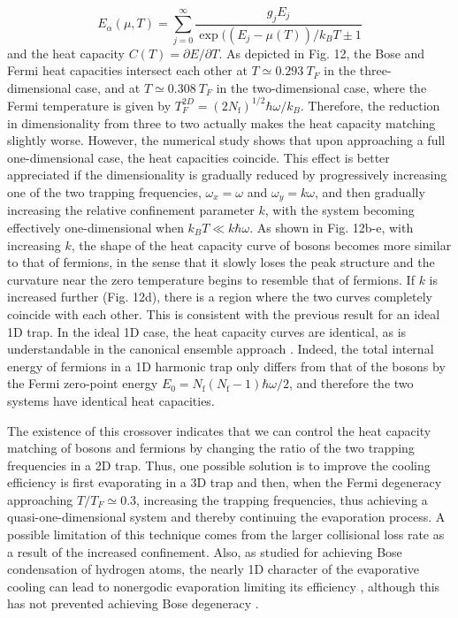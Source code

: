 \documentclass[pra,letterpaper,twocolumn,showpacs,superscriptaddress]{revtex4}
\begin{document}
\begin{equation}
E_\alpha(\mu, T) = \sum_{j=0}^{\infty} \frac{g_j E_j}{\exp((E_j - \mu(T))/k_B T\pm 1}
\end{equation}
and the heat capacity $C (T) = \partial E/\partial T$.  As depicted in Fig. 12, the Bose and Fermi heat capacities intersect each other at 
$T \simeq 0.293~T_F$ in the three-dimensional case, and at $T \simeq 0.308~T_F$ in the two-dimensional case, where the Fermi temperature is 
given by $T_F^{2D} = (2N_\mathrm{f})^{1/2} \hbar \omega/k_B$. Therefore, the reduction in dimensionality from three to two actually makes the heat capacity 
matching slightly worse. However, the numerical study shows that upon approaching a full one-dimensional case, the heat capacities coincide. 
This effect is better appreciated if the dimensionality is gradually reduced by progressively increasing one of the two trapping frequencies, 
$\omega_x=\omega$ and $\omega_y=k \omega$, and then gradually increasing the relative confinement parameter $k$, with the  
system becoming effectively one-dimensional when $k_B T \ll k \hbar \omega$.  As shown in Fig. 12b-e, with increasing $k$, the
shape of the heat capacity curve of bosons becomes more similar to that of fermions, in the sense that it slowly loses the peak structure  
and the curvature near the zero temperature begins to resemble that of fermions. If $k$ is increased further (Fig. 12d), there is
 a region where the two curves completely coincide with each other. This is consistent with the previous result for an ideal 1D
trap.  In the ideal 1D case, the heat capacity curves are identical, as is understandable in the canonical ensemble approach \cite{Schonhammer2000,Mullin2003}. 
Indeed, the total internal energy of fermions in a 1D harmonic trap only differs from that of the bosons by the Fermi zero-point energy $E_0 =N_\mathrm{f}(N_\mathrm{f}-1)\hbar \omega/2$, 
and therefore the two systems have identical heat capacities. 

The existence of this crossover indicates that we can control the heat capacity matching of bosons and fermions by changing 
the ratio of the two trapping frequencies in a 2D trap. Thus, one possible solution is to improve the cooling efficiency is 
first evaporating in a 3D trap and then, when the Fermi degeneracy approaching $T/T_F \simeq 0.3$, increasing the trapping 
frequencies, thus achieving a quasi-one-dimensional system and thereby continuing the evaporation process.
A possible limitation of this technique comes from the larger collisional loss rate as a result of the increased confinement.
Also, as studied for achieving Bose condensation of hydrogen atoms, the nearly 1D character of the evaporative cooling \cite{Pinkse1998} can  
lead to nonergodic evaporation limiting its efficiency \cite{Surkov1996}, although this has not prevented achieving Bose degeneracy 
\cite{Gorlitz2001a,Schreck2001b,Greiner2001,Moritz2003}. 
\end{document}

